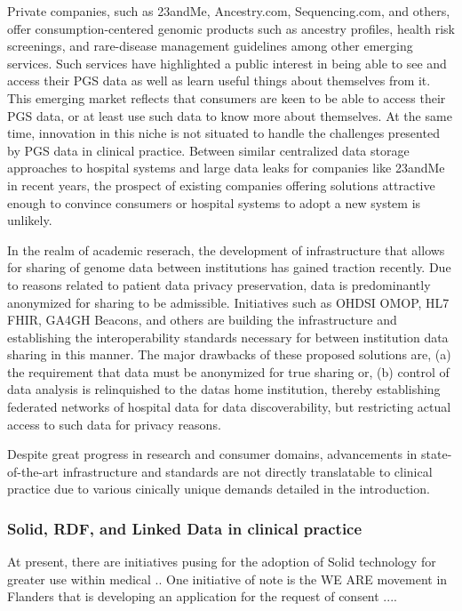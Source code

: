 \documentclass[runningheads]{llncs}
\begin{document}
Private companies, such as 23andMe, Ancestry.com, Sequencing.com, and others, offer consumption-centered genomic products such as ancestry profiles, health risk screenings, and rare-disease management guidelines among other emerging services. 
Such services have highlighted a public interest in being able to see and access their PGS data as well as learn useful things about themselves from it.
This emerging market reflects that consumers are keen to be able to access their PGS data, or at least use such data to know more about themselves. 
At the same time, innovation in this niche is not situated to handle the challenges presented by PGS data in clinical practice. 
Between similar centralized data storage approaches to hospital systems and large data leaks for companies like 23andMe in recent years, the prospect of existing companies offering solutions attractive enough to convince consumers or hospital systems to adopt a new system is unlikely. 

In the realm of academic reserach, the development of infrastructure that allows for sharing of genome data between institutions has gained traction recently. 
Due to reasons related to patient data privacy preservation, data is predominantly anonymized for sharing to be admissible. 
Initiatives such as OHDSI OMOP, HL7 FHIR, GA4GH Beacons, and others are building the infrastructure and establishing the interoperability standards necessary for between institution data sharing in this manner. 
The major drawbacks of these proposed solutions are, (a) the requirement that data must be anonymized for true sharing or, (b) control of data analysis is relinquished to the data\textquotesingle s home institution, thereby establishing federated networks of hospital data for data discoverability, but restricting actual access to such data for privacy reasons.

Despite great progress in research and consumer domains, advancements in state-of-the-art infrastructure and standards are not directly translatable to clinical practice due to various cinically unique demands detailed in the introduction. 

\subsubsection{Solid, RDF, and Linked Data in clinical practice}
At present, there are initiatives pusing for the adoption of Solid technology for greater use within medical ..
One initiative of note is the WE ARE movement in Flanders that is developing an application for the request of consent ....
\end{document}
